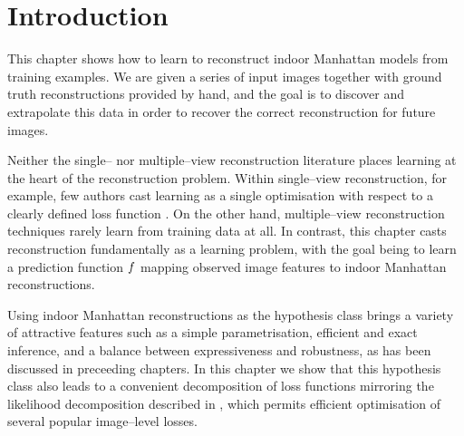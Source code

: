 
\section{Introduction}
\label{sec:introduction}

This chapter shows how to learn to reconstruct indoor Manhattan models
from training examples. We are given a series of input images together
with ground truth reconstructions provided by hand, and the goal is to
discover and extrapolate this data in order to recover the correct
reconstruction for future images.

Neither the single-- nor multiple--view reconstruction literature
places learning at the heart of the reconstruction problem. Within
single--view reconstruction, for example, few authors cast learning as
a single optimisation with respect to a clearly defined loss function
\cite{Hoiem05,Saxena09,Lee09,Flint11}. On the other hand,
multiple--view reconstruction techniques rarely learn from training
data at all. In contrast, this chapter casts reconstruction
fundamentally as a learning problem, with the goal being to learn a
prediction function $\Predictor$ mapping observed image features to
indoor Manhattan reconstructions.

Using indoor Manhattan reconstructions as the hypothesis class brings
a variety of attractive features such as a simple parametrisation,
efficient and exact inference, and a balance between expressiveness
and robustness, as has been discussed in preceeding chapters. In this
chapter we show that this hypothesis class also leads to a convenient
decomposition of loss functions mirroring the likelihood decomposition
described in , which permits efficient optimisation of
several popular image--level losses.

